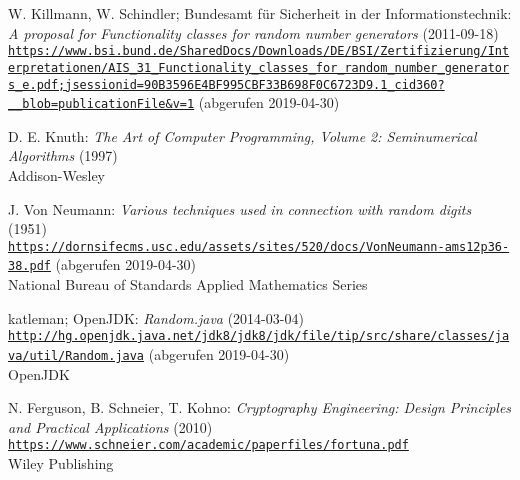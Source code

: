 \documentclass{article}
\begin{document}


    
    \begin{thebibliography}{9}
        W. Killmann, W. Schindler; Bundesamt f\"ur Sicherheit in der Informationstechnik:
        \textit{A proposal for Functionality classes for random number generators} (2011-09-18)
        \\\texttt{\url{https://www.bsi.bund.de/SharedDocs/Downloads/DE/BSI/Zertifizierung/Interpretationen/AIS_31_Functionality_classes_for_random_number_generators_e.pdf;jsessionid=90B3596E4BF995CBF33B698F0C6723D9.1_cid360?__blob=publicationFile&v=1}}
        (abgerufen 2019-04-30)

        D. E. Knuth:
        \textit{The Art of Computer Programming, Volume 2: Seminumerical Algorithms} (1997)
        \\ Addison-Wesley

        J. Von Neumann:
        \textit{Various techniques used in connection with random digits} (1951)
        \\\texttt{\url{https://dornsifecms.usc.edu/assets/sites/520/docs/VonNeumann-ams12p36-38.pdf}}
        (abgerufen 2019-04-30)
        \\ National Bureau of Standards Applied Mathematics Series

        katleman; OpenJDK:
        \textit{Random.java} (2014-03-04)
        \\\texttt{\url{http://hg.openjdk.java.net/jdk8/jdk8/jdk/file/tip/src/share/classes/java/util/Random.java}}
        (abgerufen 2019-04-30)
        \\ OpenJDK

        N. Ferguson, B. Schneier, T. Kohno:
        \textit{Cryptography Engineering: Design Principles and Practical Applications} (2010)
        \\\texttt{\url{https://www.schneier.com/academic/paperfiles/fortuna.pdf}}
        \\ Wiley Publishing
    \end{thebibliography}
\end{document}
